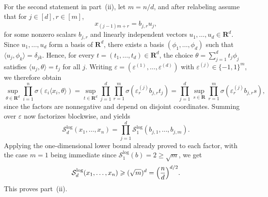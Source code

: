 \documentclass[11pt, letterpaper, hidelinks]{article}
\makeatletter
\renewcommand{\proofname}{\textit{\textbf{Proof}}}
\renewenvironment{proof}[1][\proofname]{\par\pushQED{\qed}\normalfont \topsep6\p@\@plus6\p@\relax\trivlist\item[\hskip\labelsep#1\@addpunct{}]\ignorespaces}{\popQED\endtrivlist\@endpefalse}
\newcommand{\R}{\mathbf R}
\newcommand{\1}{\mathbf 1}
\newcommand{\eps}{\varepsilon}
\renewcommand{\ge}{\geqslant}
\renewcommand{\geq}{\geqslant}
\theoremstyle{plain}
\theoremstyle{definition}
\newcommand{\defn}{=}
\makeatother
\begin{document}
\begin{proof}
For the second statement in part~(ii), let \(m \defn n/d\), and after relabeling assume that for $j\in[d], r\in[m]$,
\[
x_{(j-1)m+r}=b_{j,r}u_j,
\]
for some nonzero scalars \(b_{j,r}\) and linearly independent vectors \(u_1,\dots,u_d \in \R^d\).
Since \(u_1,\dots,u_d\) form a basis of \(\R^d\), there exists a basis $(\phi_1, \dots, \phi_d)$ such that \(\langle u_j,\phi_k\rangle=\delta_{jk}\). Hence, for every \(t=(t_1,\dots,t_d)\in\R^d\), the choice \(\theta=\sum_{j=1}^d t_j \phi_j\) satisfies \(\langle u_j,\theta\rangle=t_j\) for all \(j\). Writing \(\eps=(\eps^{(1)},\dots,\eps^{(d)})\) with \(\eps^{(j)}\in\{-1,1\}^m\), we therefore obtain
\[
\sup_{\theta\in\R^d}\prod_{i=1}^n \sigma(\eps_i\langle x_i,\theta\rangle)
=
\sup_{t\in\R^d}\prod_{j=1}^d\prod_{r=1}^m \sigma(\eps_r^{(j)} b_{j,r} t_j)
=
\prod_{j=1}^d \sup_{s\in\R}\prod_{r=1}^m \sigma(\eps_r^{(j)} b_{j,r} s),
\]
since the factors are nonnegative and depend on disjoint coordinates. Summing over \(\eps\) now factorizes blockwise, and yields
\[
\mathcal S_d^{\operatorname{log}}(x_1,\dots,x_n)
=
\prod_{j=1}^d \mathcal S_1^{\operatorname{log}}(b_{j,1},\dots,b_{j,m}).
\]
Applying the one-dimensional lower bound already proved to each factor, with the case $m=1$ being immediate since $\mathcal S_1^{\operatorname{log}}(b)=2\geq\sqrt m$, we get
\[
\mathcal S_d^{\operatorname{log}}(x_1,\dots,x_n)
\ge
(\sqrt m)^d
=
\Bigl(\frac nd\Bigr)^{d/2}.
\]
This proves part~(ii).


\end{proof}
\end{document}
